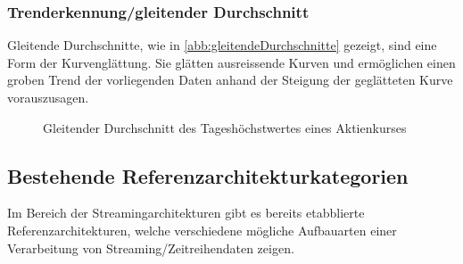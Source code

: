 \subsubsection{Trenderkennung/gleitender Durchschnitt}
Gleitende Durchschnitte, wie in \autoref{abb:gleitendeDurchschnitte} gezeigt, sind eine Form der Kurvenglättung. Sie glätten ausreissende Kurven und ermöglichen einen groben Trend der vorliegenden Daten anhand der Steigung der geglätteten Kurve vorauszusagen.
\begin{figure}[H]
\centering
{}
\caption{Gleitender Durchschnitt des Tageshöchstwertes eines Aktienkurses}
\label{abb:gleitendeDurchschnitte}
\end{figure}






\subsection{Bestehende Referenzarchitekturkategorien}
Im Bereich der Streamingarchitekturen gibt es bereits etabblierte Referenzarchitekturen, welche verschiedene mögliche Aufbauarten einer Verarbeitung von Streaming/Zeitreihendaten zeigen.

